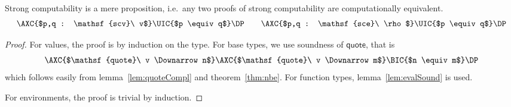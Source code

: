 \documentclass[a4paper,english]{lipics-v2019}
\newcommand{\agdaSymb}[1]{\mathsf{#1}}
\newcommand{\q}{\agdaSymb{quote}}
\newcommand{\scv}{\agdaSymb{scv}}
\newcommand{\sce}{\agdaSymb{sce}}
\newcommand{\Da}{\Downarrow}
\begin{document}
\begin{lemma}
  Strong computability is a mere proposition, i.e.\ any two proofs of strong
  computability are computationally equivalent.
  \label{lem:scvProp}
  \[
    \AXC{$p,q : \scv\ v$}\UIC{$p \equiv q$}\DP \qquad
    \AXC{$p,q : \sce\ \rho$}\UIC{$p \equiv q$}\DP
  \]
\end{lemma}
\begin{proof}
  For values, the proof is by induction on the type.
  For base types, we use soundness of $\q$, that is
  \[
    \AXC{$\q\ v \Da n$}
    \AXC{$\q\ v \Da m$}
    \BIC{$n \equiv m$}
    \DP
  \]
  which follows easily from lemma~\ref{lem:quoteCompl} and theorem~\ref{thm:nbe}.
  For function types, lemma~\ref{lem:evalSound} is used.

  For environments, the proof is trivial by induction.
\end{proof}
\end{document}
